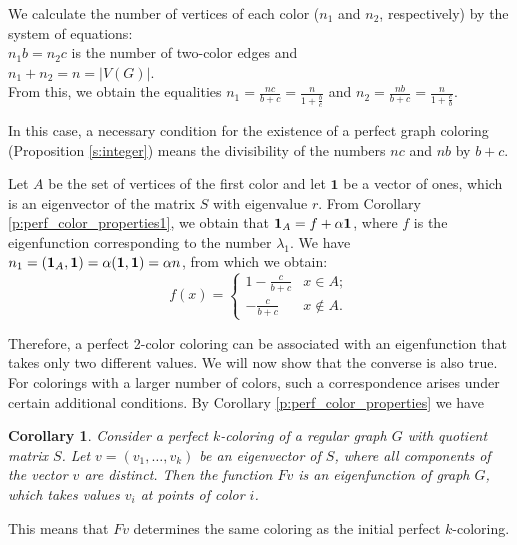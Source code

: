 \documentclass[11pt]{article}
\newtheorem{corollary}{Corollary}[section]
\theoremstyle{definition}
\begin{document}
We calculate the number of vertices of each color
($n_1$ and $n_2$, respectively) by the system of equations:\\
$n_1 b=n_2 c$
is the number of two-color edges and  \\
$n_1+n_2=n=|V(G)|$.\\
From this, we obtain the equalities $n_1 =
\frac{nc}{b+c}=\frac{n}{1+\frac{b}{c}}$ and $n_2 =
\frac{nb}{b+c}=\frac{n}{1+\frac{c}{b}}$.

{ In this case, a necessary condition for the existence of a perfect
graph coloring (Proposition \ref{s:integer}) means the divisibility
of the numbers $nc$ and $nb$ by $b+c$.}

Let $A$ be the set of vertices of the first color and let $\mathbf{1}$
be a vector of ones, which is an eigenvector of the matrix $S$ with eigenvalue $r$. From Corollary \ref{p:perf_color_properties1}, we obtain
that ${\bf 1}_{A} = f + \alpha\mathbf{1}$, where $f$ is the eigenfunction corresponding to the number $\lambda_1$. We have
$n_1=({\bf 1}_{A},\mathbf{1})= \alpha(\mathbf{1},\mathbf{1})=\alpha
n$, from which we obtain:
\[
f(x)=\left\{
\begin{array}{ll}
1-\frac{c}{b+c} & x\in A;\\
-\frac{c}{b+c} & x\notin A.
\end{array}
\right.
\]

Therefore, a perfect 2-color coloring can be associated
with an eigenfunction that takes only two different values. We will now show that the converse is also true.
For colorings with a larger number of colors, such a correspondence
arises under certain additional conditions.  By Corollary \ref{p:perf_color_properties} we have 

\begin{corollary}\label{z:colorlin0}
Consider a perfect $k$-coloring of a regular graph $G$ with quotient matrix $S$. Let $v=(v_1,\dots,v_k)$ be an eigenvector of $S$, where all components of the vector $v$ are distinct.
Then the function $Fv$
is an eigenfunction of graph $G$, which takes values $v_i$ at points of color $i$.
\end{corollary}


This means that $Fv$ determines the same coloring as the initial perfect $k$-coloring.
\end{document}

